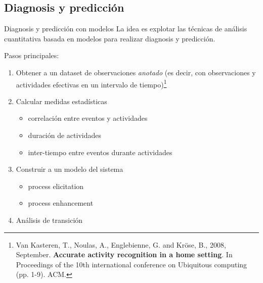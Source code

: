 \documentclass[9pt, handout]{beamer}
\begin{document}
    \subsection{Diagnosis y predicción}
      
%        
%        
      
      \begin{frame}{Diagnosis y predicción con modelos}
        \pause
        La idea es explotar las técnicas de análisis cuantitativa basada en modelos para realizar diagnosis y predicción.\\[1em]
        
        \pause
        
        Pasos principales:
        \pause
        \begin{enumerate}
          \item Obtener a un dataset de observaciones \textit{anotado} (es decir, con observaciones y actividades efectivas en un intervalo de tiempo)\footnote{Van Kasteren, T., Noulas, A., Englebienne, G. and Kröse, B., 2008, September. \textbf{Accurate activity recognition in a home setting}. In Proceedings of the 10th international conference on Ubiquitous computing (pp. 1-9). ACM.}
          \pause
          \item Calcular medidas estadísticas
          \begin{itemize}
            \item correlación entre eventos y actividades
            \item duración de actividades
            \item inter-tiempo entre eventos durante actividades
          \end{itemize}
          \pause
          \item Construir a un modelo del sistema
          \begin{itemize}
            \item process elicitation
            \item process enhancement
          \end{itemize}
          \pause
          \item Análisis de transición
        \end{enumerate}
      \end{frame}
        
\end{document}
